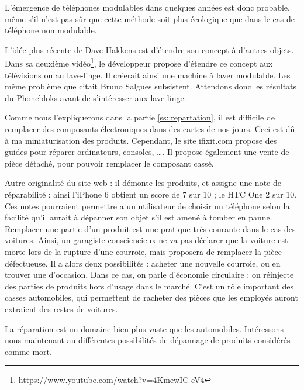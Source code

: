 \medbreak 

L'émergence de téléphones modulables dans quelques années est donc probable, même s'il n'est pas sûr que cette méthode soit plus écologique que dans le cas de téléphone non modulable. 

L'idée plus récente de Dave Hakkens est d'étendre son concept à d'autres objets. Dans sa deuxième vidéo\footnote{https://www.youtube.com/watch?v=4KmewIC-eV4}, le développeur propose d'étendre ce concept aux télévisions ou au lave-linge. Il créerait ainsi une machine à laver modulable. Les même problème que citait Bruno Salgues subsistent. Attendons donc les résultats du Phonebloks avant de s'intéresser aux lave-linge. 

\bigbreak

Comme nous l'expliquerons dans la partie \ref{ss::repartation}, il est difficile de remplacer des composants électroniques dans des cartes de nos jours. Ceci est dû à ma miniaturisation des produits. Cependant, le site ifixit.com propose des guides pour réparer ordinateurs, consoles, \dots. Il propose également une vente de pièce détaché, pour pouvoir remplacer le composant cassé. 

Autre originalité du site web : il démonte les produits, et assigne une note de réparabilité : ainsi l'iPhone 6 obtient un score de 7 sur 10 ; le HTC One 2 sur 10.  Ces notes pourraient permettre a un utilisateur de choisir un téléphone selon la facilité qu'il aurait à dépanner son objet s'il est amené à tomber en panne. 
\medbreak
Remplacer une partie d'un produit est une pratique très courante dans le cas des voitures. 
Ainsi, un garagiste consciencieux ne va pas déclarer que la voiture est morte lors de la rupture d'une courroie, mais proposera de remplacer la pièce défectueuse. Il a alors deux possibilités : acheter une nouvelle courroie, ou en trouver une d'occasion. Dans ce cas, on parle d'économie circulaire : on réinjecte des parties de produits hors d'usage dans le marché. C'est un rôle important des casses automobiles, qui permettent de racheter des pièces que les employés auront extraient des restes de voitures. 

La réparation est un domaine bien plus vaste que les automobiles. Intéressons nous maintenant au différentes possibilités de dépannage de produits considérés comme mort. 